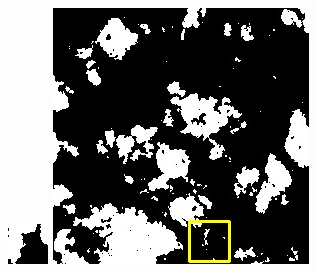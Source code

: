 \documentclass[UTF8]{ctexart}
\begin{document}
\begin{figure}[H]
{\begin{minipage}[b]{0.15\linewidth}
            \includegraphics[width=1\linewidth]{../log/spoon2/cut/tmp_cut_LC80350192014190LGN00_06561_mask.jpg}\vspace{4pt}
            \includegraphics[width=1\linewidth]{../log/spoon2/cut/LC80980712014024LGN00_15443_mask.jpg}\vspace{4pt}

\end{minipage}}
\end{figure}
\end{document}
